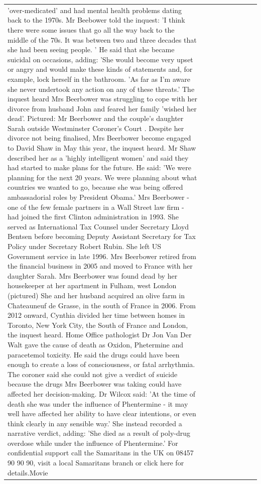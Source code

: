 \begin{table}[H]
\begin{tabular}{lllrlllll}
'over-medicated' and had mental health problems dating back to the 1970s. Mr Beebower told the inquest: 'I think there were some issues that go all the way back to the middle of the 70s. It was between two and three decades that she had been seeing people. ' He said that she became suicidal on occasions, adding: 'She would become very upset or angry and would make these kinds of statements and, for example, lock herself in the bathroom. 'As far as I'm aware she never undertook any action on any of these threats.' The inquest heard Mrs Beerbower was struggling to cope with her divorce from husband John and feared her family 'wished her dead'. Pictured: Mr Beerbower and the couple's daughter Sarah outside Westminster Coroner's Court . Despite her divorce not being finalised, Mrs Beerbower become engaged to David Shaw in May this year, the inquest heard. Mr Shaw described her as a 'highly intelligent women' and said they had started to make plans for the future. He said: 'We were planning for the next 20 years. We were planning about what countries we wanted to go, because she was being offered ambassadorial roles by President Obama.' Mrs Beerbower - one of the few female partners in a Wall Street law firm - had joined the first Clinton administration in 1993. She served as International Tax Counsel under Secretary Lloyd Bentsen before becoming Deputy Assistant Secretary for Tax Policy under Secretary Robert Rubin. She left US Government service in late 1996. Mrs Beerbower retired from the financial business in 2005 and moved to France with her daughter Sarah. Mrs Beerbower was found dead by her housekeeper at her apartment in Fulham, west London (pictured) She and her husband acquired an olive farm in Chateauneuf de Grasse, in the south of France in 2006. From 2012 onward, Cynthia divided her time between homes in Toronto, New York City, the South of France and London, the inquest heard. Home Office pathologist Dr Jon Van Der Walt gave the cause of death as Oxidon, Phetermine and paracetemol toxicity. He said the drugs could have been enough to create a loss of consciousness, or fatal arrhythmia. The coroner said she could not give a verdict of suicide because the drugs Mrs Beerbower was taking could have affected her decision-making. Dr Wilcox said: 'At the time of death she was under the influence of Phentermine - it may well have affected her ability to have clear intentions, or even think clearly in any sensible way.' She instead recorded a narrative verdict, adding: 'She died as a result of poly-drug overdose while under the influence of Phentermine.' For confidential support call the Samaritans in the UK on 08457 90 90 90, visit a local Samaritans branch or click here for details.Movie \\

\end{tabular}
\end{table}
